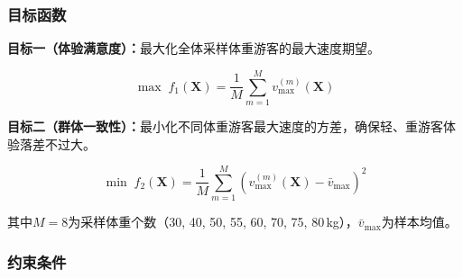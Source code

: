 \documentclass[12pt,a4paper]{ctexart}
\begin{document}
\begin{center}
\end{center}

\subsubsection{目标函数}

\textbf{目标一（体验满意度）：}最大化全体采样体重游客的最大速度期望。

\begin{equation}
  \max\; f_1(\mathbf{X}) = \frac{1}{M}\sum_{m=1}^{M} v^{(m)}_{\max}(\mathbf{X})
  \label{eq:obj1}
\end{equation}

\textbf{目标二（群体一致性）：}最小化不同体重游客最大速度的方差，确保轻、重游客体验落差不过大。

\begin{equation}
  \min\; f_2(\mathbf{X}) = \frac{1}{M}\sum_{m=1}^{M}\left(v^{(m)}_{\max}(\mathbf{X}) - \bar{v}_{\max}\right)^2
  \label{eq:obj2}
\end{equation}

其中$M=8$为采样体重个数（30, 40, 50, 55, 60, 70, 75, 80\,kg），$\bar{v}_{\max}$为样本均值。

\subsubsection{约束条件}
\end{document}
